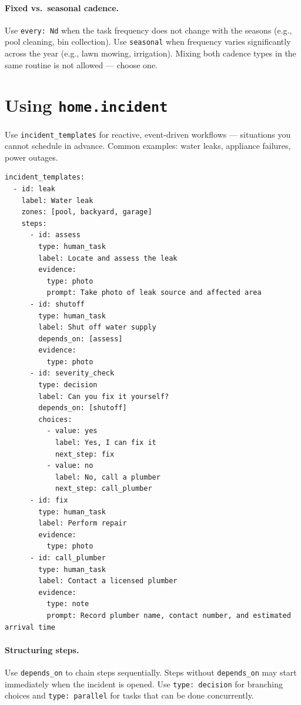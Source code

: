 \paragraph{Fixed vs.\ seasonal cadence.}
Use \texttt{every: Nd} when the task frequency does not change with the seasons (e.g., pool
cleaning, bin collection). Use \texttt{seasonal} when frequency varies significantly across
the year (e.g., lawn mowing, irrigation). Mixing both cadence types in the same routine
is not allowed --- choose one.

\section{Using \texttt{home.incident}}
\label{sec:authoring-incidents}

Use \texttt{incident\_templates} for reactive, event-driven workflows --- situations you
cannot schedule in advance. Common examples: water leaks, appliance failures, power outages.

\begin{verbatim}
incident_templates:
  - id: leak
    label: Water leak
    zones: [pool, backyard, garage]
    steps:
      - id: assess
        type: human_task
        label: Locate and assess the leak
        evidence:
          type: photo
          prompt: Take photo of leak source and affected area
      - id: shutoff
        type: human_task
        label: Shut off water supply
        depends_on: [assess]
        evidence:
          type: photo
      - id: severity_check
        type: decision
        label: Can you fix it yourself?
        depends_on: [shutoff]
        choices:
          - value: yes
            label: Yes, I can fix it
            next_step: fix
          - value: no
            label: No, call a plumber
            next_step: call_plumber
      - id: fix
        type: human_task
        label: Perform repair
        evidence:
          type: photo
      - id: call_plumber
        type: human_task
        label: Contact a licensed plumber
        evidence:
          type: note
          prompt: Record plumber name, contact number, and estimated arrival time
\end{verbatim}

\paragraph{Structuring steps.}
Use \texttt{depends\_on} to chain steps sequentially. Steps without \texttt{depends\_on}
may start immediately when the incident is opened. Use \texttt{type: decision} for branching
choices and \texttt{type: parallel} for tasks that can be done concurrently.

